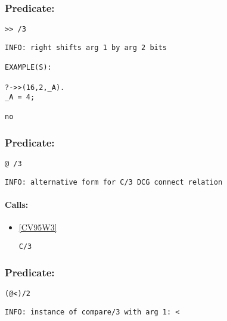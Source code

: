 \subsubsection{Predicate:} \label{V62WV62WV95W3}

\begin{verbatim}
>> /3
\end{verbatim}

{\small \begin{verbatim}
INFO: right shifts arg 1 by arg 2 bits

EXAMPLE(S):

?->>(16,2,_A).
_A = 4;

no

\end{verbatim}}

\subsubsection{Predicate:} \label{V64WV95W3}

\begin{verbatim}
@ /3
\end{verbatim}

{\small \begin{verbatim}
INFO: alternative form for C/3 DCG connect relation

\end{verbatim}}
\paragraph{Calls:} 
\begin{itemize}
\item \ref{CV95W3} 
\begin{verbatim}
C/3
\end{verbatim}

\end{itemize}

\subsubsection{Predicate:} \label{V64WV60WV95W2}

\begin{verbatim}
(@<)/2
\end{verbatim}

{\small \begin{verbatim}
INFO: instance of compare/3 with arg 1: <

\end{verbatim}}

